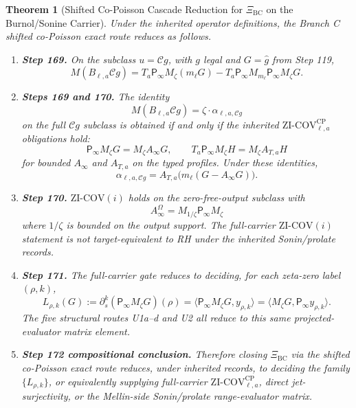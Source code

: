 \documentclass[11pt]{article}
\newtheorem{theorem}{Theorem}
\newcommand{\XiBC}{\Xi_{\mathrm{BC}}}
\newcommand{\Psym}{\mathsf P_\infty}
\newcommand{\Mz}{M_\zeta}
\newcommand{\Ml}{M_{m_\ell}}
\newcommand{\Cg}{\mathcal Cg}
\begin{document}
\begin{theorem}[Shifted Co-Poisson Cascade Reduction for \(\XiBC\) on the Burnol/Sonine Carrier]
Under the inherited operator definitions, the Branch C shifted co-Poisson
exact route reduces as follows.

\begin{enumerate}[label=(\alph*),leftmargin=*]
\item \textbf{Step 169.} On the subclass \(u=\Cg\), with \(g\) legal and
\(G=\widehat g\) from Step 119,
\[
  M(B_{\ell,a}\Cg)
  =
  T_a\Psym\Mz(m_\ell G)
  -
  T_a\Psym\Ml\Psym\Mz G.
\]

\item \textbf{Steps 169 and 170.} The identity
\[
  M(B_{\ell,a}\Cg)=\zeta\cdot\alpha_{\ell,a,\Cg}
\]
on the full \(\Cg\) subclass is obtained if and only if the inherited
\(\mathrm{ZI\mbox{-}COV}_{\ell,a}^{\mathrm{CP}}\) obligations hold:
\[
  \Psym\Mz G=\Mz A_\infty G,
  \qquad
  T_a\Psym\Mz H=\Mz A_{T,a}H
\]
for bounded \(A_\infty\) and \(A_{T,a}\) on the typed profiles.  Under these
identities,
\[
  \alpha_{\ell,a,\Cg}
  =
  A_{T,a}\bigl(m_\ell(G-A_\infty G)\bigr).
\]

\item \textbf{Step 170.} \(\mathrm{ZI\mbox{-}COV}(i)\) holds on the
zero-free-output subclass with
\[
  A_\infty^\Omega=M_{1/\zeta}\Psym\Mz
\]
where \(1/\zeta\) is bounded on the output support.  The full-carrier
\(\mathrm{ZI\mbox{-}COV}(i)\) statement is not target-equivalent to RH under
the inherited Sonin/prolate records.

\item \textbf{Step 171.} The full-carrier gate reduces to deciding, for each
zeta-zero label \((\rho,k)\),
\[
  L_{\rho,k}(G)
  :=
  \partial_s^k(\Psym\Mz G)(\rho)
  =
  \langle \Psym\Mz G,y_{\rho,k}\rangle
  =
  \langle \Mz G,\Psym y_{\rho,k}\rangle .
\]
The five structural routes U1a--d and U2 all reduce to this same
projected-evaluator matrix element.

\item \textbf{Step 172 compositional conclusion.} Therefore closing \(\XiBC\) via the
shifted co-Poisson exact route reduces, under inherited records, to deciding
the family \(\{L_{\rho,k}\}\), or equivalently supplying full-carrier
\(\mathrm{ZI\mbox{-}COV}_{\ell,a}^{\mathrm{CP}}\), direct jet-surjectivity, or
the Mellin-side Sonin/prolate range-evaluator matrix.
\end{enumerate}
\end{theorem}
\end{document}
